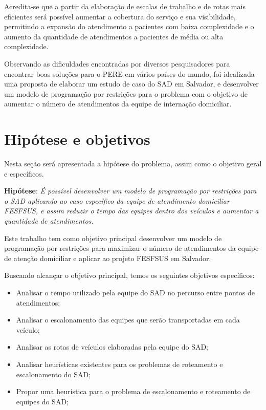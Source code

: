 Acredita-se que a partir da elaboração de escalas de trabalho e de rotas mais eficientes será possível aumentar a cobertura do serviço e sua visibilidade, permitindo a expansão do atendimento a pacientes com baixa complexidade e o aumento da quantidade de atendimentos a pacientes de média ou alta complexidade.  

Observando as dificuldades encontradas por diversos pesquisadores para encontrar boas soluções para o \ac{PERE} em vários países do mundo, foi idealizada uma proposta de elaborar um estudo de caso do \ac{SAD} em Salvador, e desenvolver um modelo de programação por restrições para o problema com o objetivo de aumentar o número de atendimentos da equipe de internação domiciliar. 


\section{Hipótese e objetivos}

Nesta seção será apresentada a hipótese do problema, assim como o objetivo geral e específicos.

\textbf{Hipótese}: \emph{É possível desenvolver um modelo de programação por restrições para o \ac{SAD} aplicando ao caso específico da equipe de atendimento domiciliar FESFSUS, e assim reduzir o tempo das equipes dentro dos veículos e aumentar a quantidade de atendimentos.}

Este trabalho tem como objetivo principal desenvolver um modelo de programação por restrições para maximizar o número de atendimentos da equipe de atenção domiciliar e aplicar ao projeto FESFSUS em Salvador. 

Buscando alcançar o objetivo principal, temos os seguintes objetivos específicos:
\begin{itemize}
\item Analisar o tempo utilizado pela equipe do \ac{SAD} no percurso entre pontos de atendimentos;
\item Analisar o escalonamento das equipes que serão transportadas em cada veículo;
\item Analisar as rotas de veículos elaboradas pela equipe do \ac{SAD};
\item Analisar heurísticas existentes para os problemas de roteamento e escalonamento do \ac{SAD};
\item Propor uma heurística para o problema de escalonamento e roteamento de equipes do \ac{SAD};
\end{itemize}

